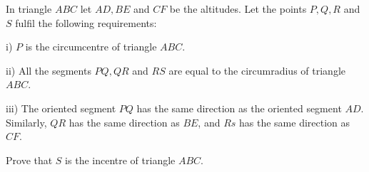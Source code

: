 In triangle $ABC$ let $AD,BE$ and $CF$ be the altitudes. Let the points $P,Q,R$ and $S$ fulfil the following requirements:

i) $P$ is the circumcentre of triangle $ABC$.

ii) All the segments $PQ,QR$ and $RS$ are equal to the circumradius of triangle $ABC$.

iii) The oriented segment $PQ$ has the same direction as the oriented segment $AD$. Similarly, $QR$ has the same direction as $BE$,  and $Rs$ has the same direction as $CF$.

Prove that $S$ is the incentre of triangle $ABC$.